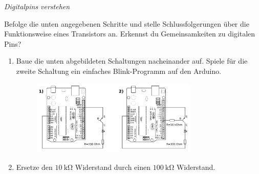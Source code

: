 \medskip

\begin{aufgabe} \emph{Digitalpins verstehen}
	
	Befolge die unten angegebenen Schritte und stelle Schlussfolgerungen über die Funktionsweise eines Transistors an. Erkennst du Gemeinsamkeiten zu digitalen Pins?
	\begin{enumerate}[label=\alph*), itemsep=0mm,parsep=0mm]
		\item Baue die unten abgebildeten Schaltungen nacheinander auf. Spiele für die zweite Schaltung ein einfaches Blink-Programm auf den Arduino.
		\begin{figure}[H]
			\centering
			\includegraphics[width=0.75\textwidth]{./Zeichnungen/Schaltplan-Transistor-verstehen.png}
		\end{figure}
		\item Ersetze den $\SI{10}{\kilo\ohm}$ Widerstand durch einen $\SI{100}{\kilo\ohm}$ Widerstand.
	\end{enumerate}
\end{aufgabe}

